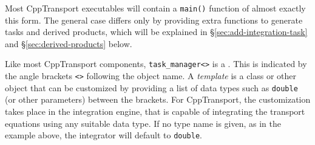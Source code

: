 \documentclass[11pt,a4paper]{article}
\newcounter{advancedbox}[section]
\newenvironment{advanced}[1]{\stepcounter{advancedbox}\begin{tcolorbox}[enhanced,breakable,colback=red!10,colbacktitle=red!20,colframe=red!40,coltitle=black,title={Advanced usage: {#1}},fonttitle=\sffamily\fontseries{b}\selectfont]}{\end{tcolorbox}}
\newcommand{\packagefont}{\sffamily}
\newcommand{\CppTransport}{{\packagefont CppTransport}}
\newcommand{\semibold}[1]{{\fontseries{b}\selectfont{#1}}}
\begin{document}
Most {\CppTransport} executables will contain a
\texttt{main()} function of almost exactly this form.
The general case differs only by providing extra functions
to generate tasks and derived products,
which will be explained in \S\ref{sec:add-integration-task}
and \S\ref{sec:derived-products}
below.

\begin{advanced}{Custom integration data types}
    \label{advanced:data-type}
    Like most {\CppTransport} components,
    \texttt{task_manager<>}
    is a \semibold{template class}. This is indicated by the
    angle brackets
    \texttt{<>} following the object name.
    A \emph{template} is a class or other object that can be customized
    by providing a list of data types 
    such as \texttt{double} (or other parameters)
    between the brackets.    
    For {\CppTransport}, the customization takes place in the integration engine,
    that is capable of integrating the transport equations using any
    suitable data type.
    If no type name is given, as in the example above,
    the integrator will default to
    \texttt{double}.
    

\end{advanced}
\end{document}

